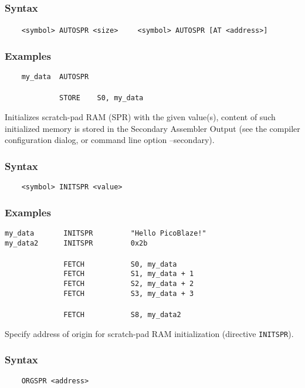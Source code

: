         \subsubsection{Syntax}
            \verb'    <symbol> AUTOSPR <size>'
            \verb'    <symbol> AUTOSPR [AT <address>]'

        \subsubsection{Examples}
            \verb'    my_data  AUTOSPR'\\
            \verb''\\
            \verb'             STORE    S0, my_data'

    \clearpage
        Initializes scratch-pad RAM (SPR) with the given value(s), content of such initialized memory is stored in the Secondary Assembler Output (see the compiler configuration dialog, or command line option --secondary).

        \subsubsection{Syntax}
            \verb'    <symbol> INITSPR <value>'

        \subsubsection{Examples}
            \verb'my_data       INITSPR         "Hello PicoBlaze!"'\\
            \verb'my_data2      INITSPR         0x2b'\\
            \verb''\\
            \verb'              FETCH           S0, my_data'\\
            \verb'              FETCH           S1, my_data + 1'\\
            \verb'              FETCH           S2, my_data + 2'\\
            \verb'              FETCH           S3, my_data + 3'\\
            \verb''\\
            \verb'              FETCH           S8, my_data2'

        Specify address of origin for scratch-pad RAM initialization (directive \texttt{INITSPR}).

        \subsubsection{Syntax}
            \verb'    ORGSPR <address>'

